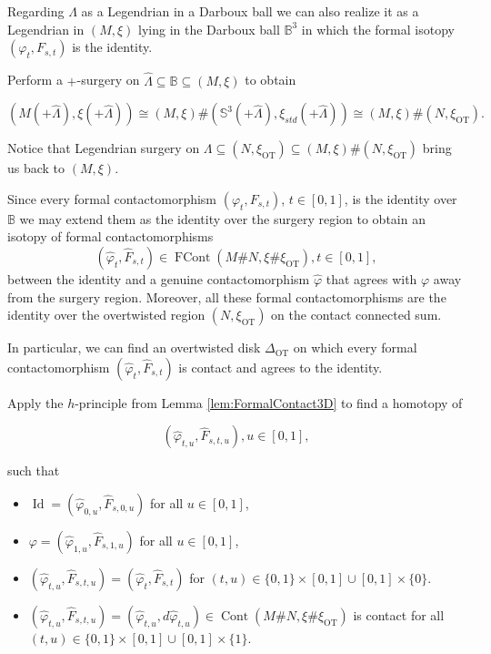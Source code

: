 \documentclass[11pt]{amsart}
\theoremstyle{plain}
\theoremstyle{definition}
\theoremstyle{remark}
\numberwithin{theorem}{section}
\newcommand{\NS}{{\mathbb{S}}}
\newcommand{\B}{{\mathbb{B}}}
\newcommand{\Id}{{\operatorname{Id}}}
\newcommand{\Cont}{\operatorname{Cont}}
\newcommand{\FCont}{\operatorname{FCont}}
\newcommand{\OT}{\operatorname{OT}}
\begin{document}
Regarding $\hat{\Lambda}$ as a Legendrian in a Darboux ball we can also realize it as a Legendrian in $(M,\xi)$ lying in the Darboux ball $\B^3$ in which the formal isotopy $(\varphi_t,F_{s,t})$ is the identity. 

Perform a $+$-surgery on $\hat{\Lambda}\subseteq \B\subseteq (M,\xi)$ to obtain 

$$ (M(+\hat{\Lambda}),\xi(+\hat{\Lambda}))\cong(M,\xi)\#(\NS^3(+\hat{\Lambda}),\xi_{std}(+\hat{\Lambda}))\cong(M,\xi)\#(N,\xi_{\OT}). $$

Notice that Legendrian surgery on $\Lambda\subseteq (N,\xi_{\OT})\subseteq (M,\xi)\#(N,\xi_{\OT})$ bring us back to $(M,\xi)$. 

Since every formal contactomorphism $(\varphi_t,F_{s,t})$, $t\in [0,1]$, is the identity over $\B$ we may extend them as the identity over the surgery region to obtain an isotopy of formal contactomorphisms 
$$ (\hat{\varphi}_t,\hat{F}_{s,t})\in \FCont(M\#N,\xi\#\xi_{\OT}),t\in[0,1], $$
between the identity and a genuine contactomorphism $\hat{\varphi}$ that agrees with $\varphi$ away from the surgery region. Moreover, all these formal contactomorphisms are the identity over the overtwisted region $(N,\xi_{\OT})$ on the contact connected sum. 

In particular, we can find an overtwisted disk $\Delta_{\OT}$ on which every formal contactomorphism $(\hat{\varphi}_t,\hat{F}_{s,t})$ is contact and agrees to the identity. 

Apply the $h$-principle from Lemma \ref{lem:FormalContact3D} to find a homotopy of 

$$ (\hat{\varphi}_{t,u},\hat{F}_{s,t,u}), u\in[0,1], $$

such that 

\begin{itemize}
    \item $\Id=(\hat{\varphi}_{0,u},\hat{F}_{s,0,u})$ for all $u\in[0,1]$, 
    \item $\varphi=(\hat{\varphi}_{1,u},\hat{F}_{s,1,u})$ for all $u\in[0,1]$, 
    \item $(\hat{\varphi}_{t,u},\hat{F}_{s,t,u})=(\hat{\varphi}_{t},\hat{F}_{s,t})$ for $(t,u)\in \{0,1\}\times[0,1]\cup [0,1]\times \{0\}$.
    \item $(\hat{\varphi}_{t,u},\hat{F}_{s,t,u})=(\hat{\varphi}_{t,u},d\hat{\varphi}_{t,u})\in\Cont(M\#N,\xi\#\xi_{\OT})$ is contact for all $(t,u)\in \{0,1\}\times[0,1]\cup [0,1]\times\{1\}$.
\end{itemize}
\end{document}
